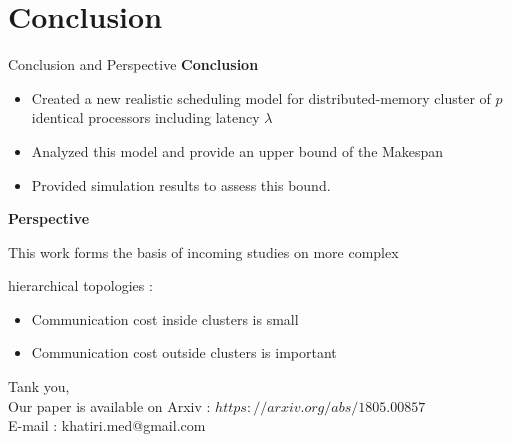 \documentclass{beamer}
\begin{document}
 \section{Conclusion}
    \begin{frame}{Conclusion and Perspective}
        \textbf{Conclusion}
            \begin{itemize}
                \item Created a new realistic scheduling model for distributed-memory cluster of $p$ identical processors including latency $\lambda$
                \item Analyzed this model and provide an upper bound of the Makespan  
                \item Provided simulation results to assess this bound. 
            \end{itemize}

            \textbf{Perspective}

            \hspace{0.3cm}    This work forms the basis of incoming studies on more complex

            \hspace{0.3cm} hierarchical topologies :

            \begin{itemize}
                \item Communication cost inside clusters is small
                \item Communication cost outside clusters is important
            \end{itemize}

    \end{frame}


\begin{frame}
    \begin{center}
                Tank you,\\
                Our paper is available on Arxiv : $https://arxiv.org/abs/1805.00857 $\\ 
                E-mail : khatiri.med@gmail.com\\
    \end{center}
\end{frame}



\end{document}
